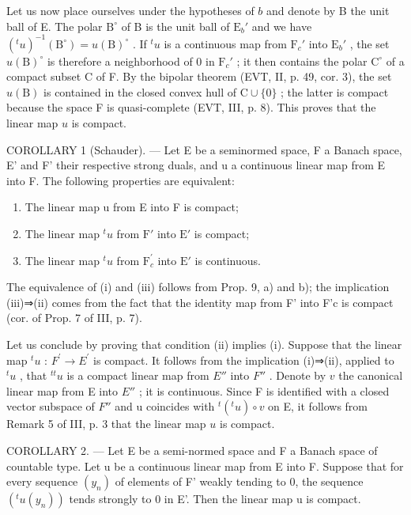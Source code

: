 Let us now place ourselves under the hypotheses of \(b\) and denote by B the unit ball of E. The polar \(\mathrm{B}^{\circ}\) of B is the unit ball of \(\mathrm{E}_b'\) and we have \((^{t}u)^{-1}(\mathrm{B}^{\circ}) = u(\mathrm{B})^{\circ}\) . If \(^{t}u\) is a continuous map from \(\mathrm{F}_c'\) into \(\mathrm{E}_b'\) , the set \(u(\mathrm{B})^{\circ}\) is therefore a neighborhood of 0 in \(\mathrm{F}_c'\) ; it then contains the polar \(\mathrm{C}^{\circ}\) of a compact subset C of F. By the bipolar theorem (EVT, II, p. 49, cor. 3), the set \(u(\mathrm{B})\) is contained in the closed convex hull of \(\mathrm{C} \cup \{0\}\) ; the latter is compact because the space F is quasi-complete (EVT, III, p. 8). This proves that the linear map \(u\) is compact.

COROLLARY 1 (Schauder). --- Let E be a seminormed space, F a Banach space, E' and F' their respective strong duals, and u a continuous linear map from E into F. The following properties are equivalent:

\begin{enumerate}
\def\labelenumi{(\roman{enumi})}
\item
  The linear map u from E into F is compact;
\item
  The linear map \({}^{t}u\) from \(\mathrm{F}'\) into \(\mathrm{E}'\) is compact;
\item
  The linear map \({}^{t}u\) from \(\mathrm{F}_{c}^{\prime}\) into \(\mathrm{E}'\) is continuous.
\end{enumerate}

The equivalence of (i) and (iii) follows from Prop. 9, a) and b); the implication (iii)⇒(ii) comes from the fact that the identity map from F' into F'c is compact (cor. of Prop. 7 of III, p. 7).

Let us conclude by proving that condition (ii) implies (i). Suppose that the linear map \({}^{t}u\) : \(F^{\prime} \to E^{\prime}\) is compact. It follows from the implication (i)⇒(ii), applied to \({}^{t}u\) , that \({}^{tt}u\) is a compact linear map from \(E''\) into \(F''\) . Denote by \(v\) the canonical linear map from E into \(E''\) ; it is continuous. Since F is identified with a closed vector subspace of \(F''\) and u coincides with \({}^{t}({}^{t}u) \circ v\) on E, it follows from Remark 5 of III, p. 3 that the linear map \(u\) is compact.

COROLLARY 2. --- Let E be a semi-normed space and F a Banach space of countable type. Let u be a continuous linear map from E into F. Suppose that for every sequence \((y_{n})\) of elements of F' weakly tending to 0, the sequence \((^{t}u(y_{n}))\) tends strongly to 0 in E'. Then the linear map u is compact.

